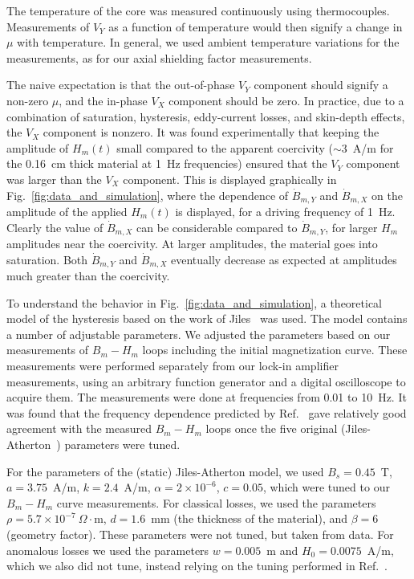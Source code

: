 The temperature of the core was measured continuously using
thermocouples.  Measurements of $V_Y$ as a function of temperature
would then signify a change in $\mu$ with temperature.  In general, we
used ambient temperature variations for the measurements, as for our
axial shielding factor measurements.


The naive expectation is that the out-of-phase $V_Y$ component should
signify a non-zero $\mu$, and the in-phase $V_X$ component should be
zero.  In practice, due to a combination of saturation, hysteresis,
eddy-current losses, and skin-depth effects, the $V_X$ component is
nonzero.  It was found experimentally that keeping the amplitude of
$H_m(t)$ small compared to the apparent coercivity ($\sim 3$~A/m for
the 0.16~cm thick material at 1~Hz frequencies) ensured that the $V_Y$
component was larger than the $V_X$ component.  This is displayed
graphically in Fig.~\ref{fig:data_and_simulation}, where the
dependence of $\dot{B}_{m,Y}$ and $\dot{B}_{m,X}$ on the amplitude of
the applied $H_m(t)$ is displayed, for a driving frequency of 1~Hz.
Clearly the value of $\dot{B}_{m,X}$ can be considerable compared to
$\dot{B}_{m,Y}$, for larger $H_m$ amplitudes near the coercivity.  At
larger amplitudes, the material goes into saturation.  Both
$\dot{B}_{m,Y}$ and $\dot{B}_{m,X}$ eventually decrease as expected at
amplitudes much greater than the coercivity.

To understand the behavior in Fig.~\ref{fig:data_and_simulation}, a
theoretical model of the hysteresis based on the work of
Jiles~\cite{bib:jiles} was used.  The model contains a number of
adjustable parameters.  We adjusted the parameters based on our
measurements of $B_m-H_m$ loops including the initial magnetization
curve.  These measurements were performed separately from our lock-in
amplifier measurements, using an arbitrary function generator and a
digital oscilloscope to acquire them.  The measurements were done at
frequencies from 0.01 to 10~Hz.  It was found that the frequency
dependence predicted by Ref.~\cite{bib:jiles} gave relatively good
agreement with the measured $B_m-H_m$ loops once the five original
(Jiles-Atherton~\cite{bib:jiles-atherton}) parameters were tuned.

For the parameters of the (static) Jiles-Atherton model, we used
$B_s=0.45$~T, $a=3.75$~A/m, $k=2.4$~A/m, $\alpha=2\times 10^{-6}$,
$c=0.05$, which were tuned to our $B_m-H_m$ curve measurements.  For
classical losses, we used the parameters $\rho=5.7\times
10^{-7}~\Omega\cdot$m, $d=1.6$~mm (the thickness of the material), and
$\beta=6$ (geometry factor).  These parameters were not tuned, but
taken from data.  For anomalous losses we used the parameters
$w=0.005$~m and $H_0=0.0075$~A/m, which we also did not tune, instead
relying on the tuning performed in Ref.~\cite{bib:jiles}.

